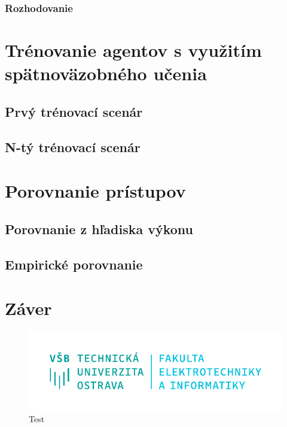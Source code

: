 \documentclass[slovak, master]{diploma}
\begin{document}
\subsection{Rozhodovanie}
\label{sec:ImplReinforcementLearningMLAgent}

\chapter{Trénovanie agentov s využitím spätnoväzobného učenia}
\label{sec:Training}
\section{Prvý trénovací scenár}
\label{sec:FirstScenario}
\section{N-tý trénovací scenár}
\label{sec:LastScenario}

\chapter{Porovnanie prístupov}
\label{sec:ImplReinforcement learning}
\section{Porovnanie z hľadiska výkonu}
\label{sec:Performance}
\section{Empirické porovnanie}
\label{sec:Gameplay}

\chapter{Záver}
\label{sec:Conclusion}

\begin{figure}[!htbp]
	\centering
	\includegraphics[width=.5\textwidth]{Figures/FEI_CZ.pdf}
	\caption{Test}
	\label{pic:Teeest}
\end{figure}
\end{document}
